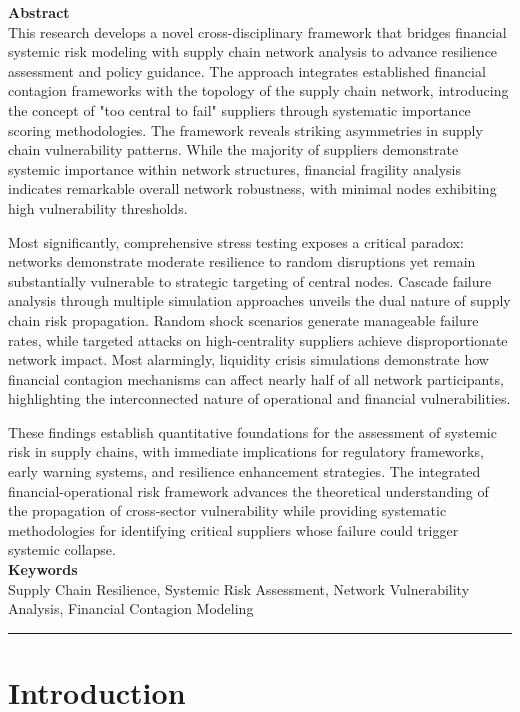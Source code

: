 \documentclass[a4 paper, 11pt,twoside]{article}
\newcommand{\0}{\Bf{0}}
\theoremstyle{definition}
\begin{document}
{\color{Brown}\bf\large Abstract}\\
This research develops a novel cross-disciplinary framework that bridges financial systemic risk modeling with supply chain network analysis to advance resilience assessment and policy guidance. The approach integrates established financial contagion frameworks with the topology of the supply chain network, introducing the concept of "too central to fail" suppliers through systematic importance scoring methodologies. The framework reveals striking asymmetries in supply chain vulnerability patterns. While the majority of suppliers demonstrate systemic importance within network structures, financial fragility analysis indicates remarkable overall network robustness, with minimal nodes exhibiting high vulnerability thresholds.

Most significantly, comprehensive stress testing exposes a critical paradox: networks demonstrate moderate resilience to random disruptions yet remain substantially vulnerable to strategic targeting of central nodes. Cascade failure analysis through multiple simulation approaches unveils the dual nature of supply chain risk propagation. Random shock scenarios generate manageable failure rates, while targeted attacks on high-centrality suppliers achieve disproportionate network impact. Most alarmingly, liquidity crisis simulations demonstrate how financial contagion mechanisms can affect nearly half of all network participants, highlighting the interconnected nature of operational and financial vulnerabilities.

These findings establish quantitative foundations for the assessment of systemic risk in supply chains, with immediate implications for regulatory frameworks, early warning systems, and resilience enhancement strategies. The integrated financial-operational risk framework advances the theoretical understanding of the propagation of cross-sector vulnerability while providing systematic methodologies for identifying critical suppliers whose failure could trigger systemic collapse.
\vspace{0.5cm}\\
{\color{Brown}\bf\large Keywords}\\
Supply Chain Resilience, Systemic Risk Assessment, Network Vulnerability Analysis, Financial Contagion Modeling
\vspace{0cm}\\
{\color{Brown}\rule{0.7\textwidth}{2pt}}
\section{Introduction}
\end{document}
